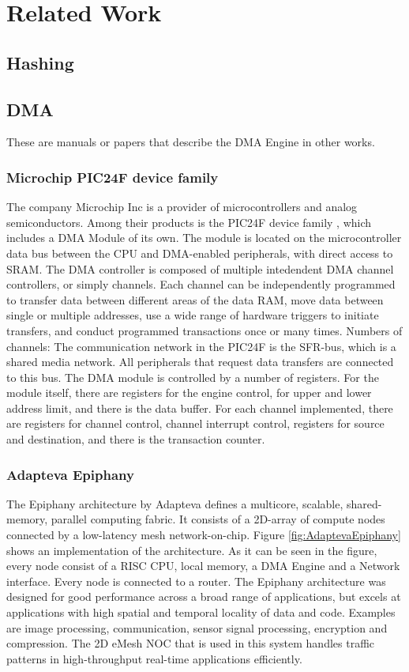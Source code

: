 \chapter{Related Work}
\section{Hashing}
\section{DMA}
These are manuals or papers that describe the DMA Engine in other works.
\subsection{Microchip PIC24F device family}
The company Microchip Inc is a provider of microcontrollers and analog semiconductors.
Among their products is the PIC24F device family \cite{microchip1}, which includes a DMA Module of its own\cite{microchip54}.
The module is located on the microcontroller data bus between the CPU and DMA-enabled peripherals, with direct access to SRAM.
The DMA controller is composed of multiple intedendent DMA channel controllers, or simply channels.
Each channel can be independently programmed to transfer data between different areas of the data RAM, move data between single or multiple addresses, use a wide range of hardware triggers to initiate transfers, and conduct programmed transactions once or many times. 
Numbers of channels: 
The communication network in the PIC24F is the SFR-bus, which is a shared media network.
All peripherals that request data transfers are connected to this bus.
The DMA module is controlled by a number of registers.
For the module itself, there are registers for the engine control, for upper and lower address limit, and there is the data buffer.
For each channel implemented, there are registers for channel control, channel interrupt control, registers for source and destination, and there is the transaction counter. 

\subsection{Adapteva Epiphany}
The Epiphany architecture by Adapteva \cite{epiphany} defines a multicore, scalable, shared-memory, parallel computing fabric.
It consists of a 2D-array of compute nodes connected by a low-latency mesh network-on-chip.
Figure \ref{fig:AdaptevaEpiphany} shows an implementation of the architecture.
As it can be seen in the figure, every node consist of a RISC CPU, local memory, a DMA Engine and a Network interface.
Every node is connected to a router.
The Epiphany architecture was designed for good performance across a broad range of applications, but excels at applications with high spatial and temporal locality of data and code.
Examples are image processing, communication, sensor signal processing, encryption and compression.
The 2D eMesh NOC that is used in this system handles traffic patterns in high-throughput real-time applications efficiently.

